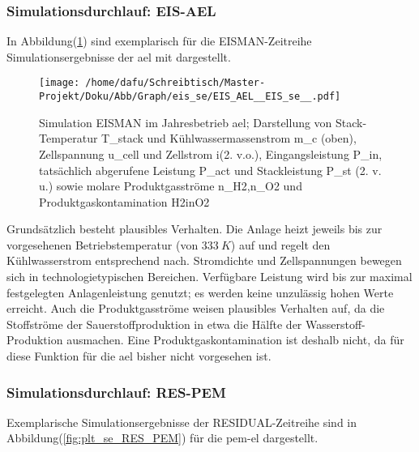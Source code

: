 \documentclass[onecolumn,10pt,titlepage]{article}
\begin{document}
\subsubsection{Simulationsdurchlauf: EIS-AEL}
In Abbildung(\ref{fig:plt_se_EIS_AEL}) sind exemplarisch für die EISMAN-Zeitreihe Simulationsergebnisse der \gls{ael} mit dargestellt.
\begin{figure}[H]
	\centering
	\texttt{[image: /home/dafu/Schreibtisch/Master-Projekt/Doku/Abb/Graph/eis\_se/EIS\_AEL\_\_EIS\_se\_\_.pdf]}

	\caption[Simulation EISMAN im Jahresbetrieb \gls{ael}]{Simulation EISMAN im Jahresbetrieb \gls{ael}; Darstellung von Stack-Temperatur \gls{T_stack} und Kühlwassermassenstrom \gls{m_c} (oben), Zellspannung \gls{u_cell} und Zellstrom \gls{i}(2. v.o.), Eingangsleistung \gls{P_in},  tatsächlich abgerufene Leistung \gls{P_act} und Stackleistung \gls{P_st} (2. v. u.) sowie molare Produktgasströme \gls{n_H2},\gls{n_O2} und Produktgaskontamination \gls{H2inO2}}
	\label{fig:plt_se_EIS_AEL}
\end{figure}
Grundsätzlich besteht plausibles Verhalten. Die Anlage heizt jeweils bis zur vorgesehenen Betriebstemperatur (von $333~K$) auf und regelt den Kühlwasserstrom entsprechend nach. Stromdichte und Zellspannungen bewegen sich in technologietypischen Bereichen.
Verfügbare Leistung wird bis zur maximal festgelegten Anlagenleistung genutzt; es werden keine unzulässig hohen Werte erreicht. Auch die Produktgasströme weisen plausibles Verhalten auf, da die Stoffströme der Sauerstoffproduktion in etwa die Hälfte der Wasserstoff-Produktion ausmachen. Eine Produktgaskontamination ist deshalb nicht, da für diese Funktion für die \gls{ael} bisher nicht vorgesehen ist.


\subsubsection{Simulationsdurchlauf: RES-PEM}
Exemplarische Simulationsergebnisse der RESIDUAL-Zeitreihe sind in Abbildung(\ref{fig:plt_se_RES_PEM}) für die \gls{pem}-\gls{el} dargestellt.\\
\end{document}
